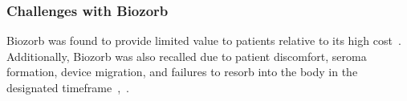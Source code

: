 \subsubsection{Challenges with Biozorb}
Biozorb was found to provide limited value to patients relative to its high cost~\cite{RefWorks:RefID:344-mitchell2019adaptable}. Additionally, Biozorb was also recalled due to patient discomfort, seroma formation, device migration, and failures to resorb into the body in the designated timeframe~\cite{RefWorks:RefID:296-2024hologic},~\cite{RefWorks:RefID:28-nudelunited}.
